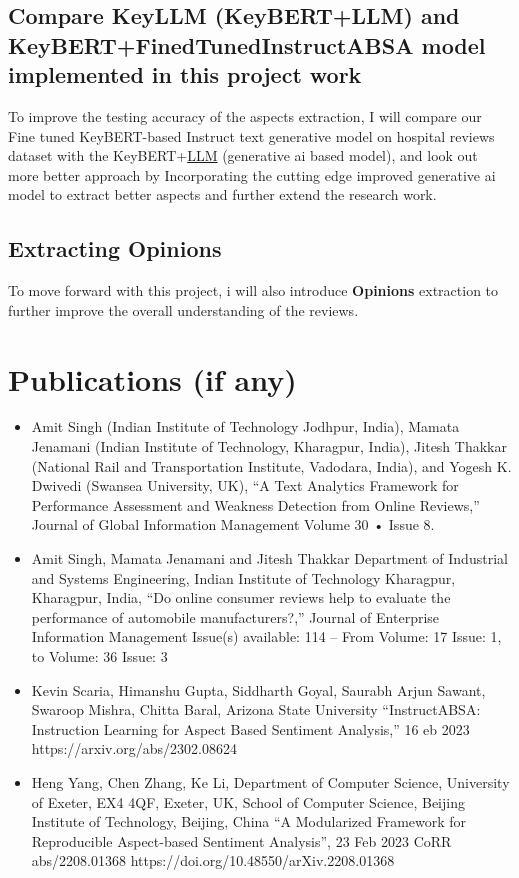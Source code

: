 \subsection{Compare KeyLLM (KeyBERT+LLM) and KeyBERT+FinedTunedInstructABSA model implemented in this project work}
To improve the testing accuracy of the aspects extraction, I will compare our Fine tuned KeyBERT-based Instruct text generative model on hospital reviews dataset with the KeyBERT+\href{https://huggingface.co/mistralai/Mistral-7B-Instruct-v0.1}{LLM} (generative ai based model), and look out more better approach by Incorporating the cutting edge improved generative ai model to extract better aspects and further extend the research work.
\subsection{Extracting Opinions}
To move forward with this project, i will also introduce \textbf{Opinions} extraction to further improve the overall understanding of the reviews.
\clearpage
\section*{Publications  (if any)}
\begin{itemize}
    \item Amit Singh (Indian Institute of Technology Jodhpur, India), Mamata Jenamani (Indian Institute of Technology, Kharagpur, India), Jitesh Thakkar (National Rail and Transportation Institute, Vadodara, India), and Yogesh K. Dwivedi (Swansea University, UK), “A Text Analytics Framework for Performance Assessment and Weakness Detection from Online Reviews,” Journal of Global Information Management Volume 30 • Issue 8.
    \item Amit Singh, Mamata Jenamani and Jitesh Thakkar Department of Industrial and Systems Engineering, Indian Institute of Technology Kharagpur, Kharagpur, India, “Do online consumer reviews help to evaluate the performance of automobile manufacturers?,” Journal of Enterprise Information Management Issue(s) available: 114 – From Volume: 17 Issue: 1, to Volume: 36 Issue: 3
    \item Kevin Scaria, Himanshu Gupta, Siddharth Goyal, Saurabh Arjun Sawant, Swaroop Mishra, Chitta Baral, Arizona State University “InstructABSA: Instruction Learning for Aspect Based Sentiment Analysis,” 16	eb 2023 https://arxiv.org/abs/2302.08624
    \item Heng Yang, Chen Zhang, Ke Li, Department of Computer Science, University of Exeter, EX4 4QF, Exeter, UK, School of Computer Science, Beijing Institute of Technology, Beijing, China “A Modularized Framework for Reproducible Aspect-based Sentiment Analysis”, 23 Feb 2023 CoRR abs/2208.01368  https://doi.org/10.48550/arXiv.2208.01368
\end{itemize}
\clearpage
